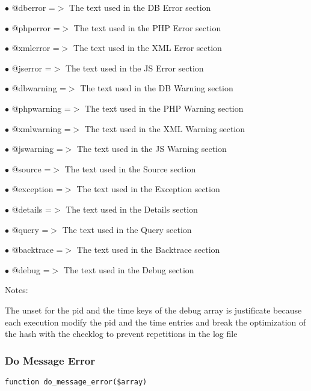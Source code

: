 \documentclass[a4paper]{article}
\begin{document}
\begin{compactitem}
\item[\color{myblue}$\bullet$] @dberror    =$>$ The text used in the DB Error section
\item[\color{myblue}$\bullet$] @phperror   =$>$ The text used in the PHP Error section
\item[\color{myblue}$\bullet$] @xmlerror   =$>$ The text used in the XML Error section
\item[\color{myblue}$\bullet$] @jserror    =$>$ The text used in the JS Error section
\item[\color{myblue}$\bullet$] @dbwarning  =$>$ The text used in the DB Warning section
\item[\color{myblue}$\bullet$] @phpwarning =$>$ The text used in the PHP Warning section
\item[\color{myblue}$\bullet$] @xmlwarning =$>$ The text used in the XML Warning section
\item[\color{myblue}$\bullet$] @jswarning  =$>$ The text used in the JS Warning section
\item[\color{myblue}$\bullet$] @source     =$>$ The text used in the Source section
\item[\color{myblue}$\bullet$] @exception  =$>$ The text used in the Exception section
\item[\color{myblue}$\bullet$] @details    =$>$ The text used in the Details section
\item[\color{myblue}$\bullet$] @query      =$>$ The text used in the Query section
\item[\color{myblue}$\bullet$] @backtrace  =$>$ The text used in the Backtrace section
\item[\color{myblue}$\bullet$] @debug      =$>$ The text used in the Debug section
\end{compactitem}

Notes:

The unset for the pid and the time keys of the debug array is justificate
because each execution modify the pid and the time entries and break the
optimization of the hash with the checklog to prevent repetitions in the
log file

\hypertarget{toc112}{}
\subsubsection{Do Message Error}

\begin{lstlisting}
function do_message_error($array)
\end{lstlisting}
\end{document}
